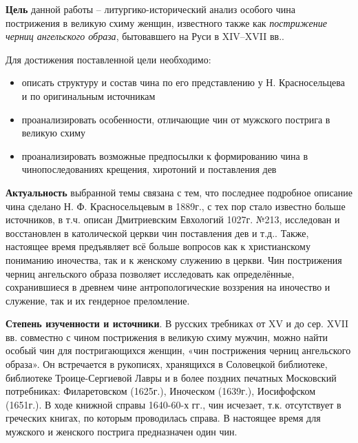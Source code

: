
\Introduction

\textbf{Цель} данной работы -- литургико-исторический анализ особого чина пострижения в великую схиму женщин, известного также как \emph{пострижение черниц ангельского образа}, бытовавшего на Руси в XIV--XVII вв..

Для достижения поставленной цели необходимо:

\begin{itemize}
\tightlist
\item
  описать структуру и состав чина по его представлению у Н. Красносельцева и по оригинальным источникам
\item
  проанализировать особенности, отличающие чин от мужского пострига в великую схиму
\item
  проанализировать возможные предпосылки к формированию чина в чинопоследованиях крещения, хиротоний и поставления дев
\end{itemize}

\textbf{Актуальность} выбранной темы связана с тем, что последнее подробное описание чина сделано Н. Ф. Красносельцевым в 1889г., с тех пор стало известно больше источников, в т.ч. описан Дмитриевским Евхологий 1027г. №213, исследован и восстановлен в католической церкви чин поставления дев и т.д..
Также, настоящее время предъявляет всё больше вопросов как к христианскому пониманию иночества, так и к женскому служению в церкви.
Чин пострижения черниц ангельского образа позволяет исследовать как определённые, сохранившиеся в древнем чине антропологические воззрения на иночество и служение, так и их гендерное преломление.

\textbf{Степень изученности и источники}.
В русских требниках от XV и до сер. XVII вв. совместно с чином пострижения в великую схиму мужчин, можно найти особый чин для постригающихся женщин, «чин пострижения черниц ангельского образа».
Он встречается в рукописях, хранящихся в Соловецкой библиотеке, библиотеке Троице-Сергиевой Лавры и в более поздних печатных Московский потребниках: Филаретовском (1625г.), Иноческом (1639г.), Иосифофском (1651г.).
В ходе книжной справы 1640-60-х гг., чин исчезает, т.к. отсутствует в греческих книгах, по которым проводилась справа.
В настоящее время для мужского и женского пострига предназначен один чин.

